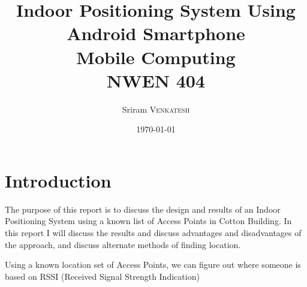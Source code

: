 \documentclass{article}
\title{Indoor Positioning System Using Android Smartphone \\ Mobile Computing \\ NWEN 404} %
\author{Sriram \textsc{Venkatesh}} %
\date{\today} %
\begin{document}
\maketitle %



\section{Introduction}
The purpose of this report is to discuss the design and results of an Indoor Positioning System using a known list of Access Points in Cotton Building. In this report I will discuss the results and discuss advantages and disadvantages of the approach, and discuss alternate methods of finding location. 

Using a known location set of Access Points,  we can figure out where someone is based on RSSI (Received Signal Strength Indication)

 






\end{document}
